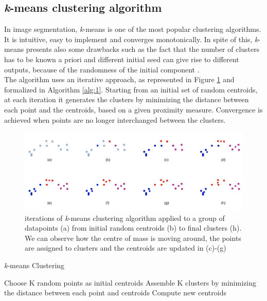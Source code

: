 \documentclass{usiinftr}
\begin{document}
\subsection{\textit{k}-means clustering algorithm} 
In image segmentation, \textit{k}-means is one of the most popular clustering algorithms. It is intuitive, easy to implement and converges monotonically. In spite of this, \textit{k}-means presents also some drawbacks such as the fact that the number of clusters has to be known a priori and different initial seed can give rise to different outputs, because of the randomness of the initial component \cite{10}. \\
The algorithm uses an iterative approach, as represented in Figure \ref{fig:1} and formalized in Algorithm \ref{alg:1}. Starting from an initial set of random centroids, at each iteration it generates the clusters by minimizing the distance between each point and the centroids, based on a given proximity measure. Convergence is achieved when points are no longer interchanged between the clusters.
\begin{figure}[h]
	\centering
	\includegraphics[scale=0.2]{./img/Kmeans_final}
	\caption{iterations of \textit{k}-means clustering algorithm applied to a group of datapoints (a) from initial random centroids (b) to final clusters (h). We can observe how the centre of mass is moving around, the points are assigned to clusters and the centroids are updated in (c)-(g)}
	\label{fig:1}
\end{figure}
\begin{algorithm}
	\caption{\textit{k}-means Clustering}\label{kmeans}
	\label{alg:1}
	\begin{algorithmic}[1]
		\State Choose K random points as initial centroids 
		\State Assemble K clusters by minimizing the distance between each point and centroids
		\State Compute new centroids
		\EndWhile
		\EndProcedure
	\end{algorithmic}
\end{algorithm} \\
\end{document}
